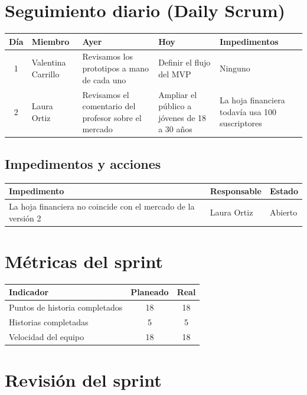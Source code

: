 \documentclass[11pt,a4paper]{article}
\begin{document}
\section{Seguimiento diario (Daily Scrum)}

\begin{tabularx}{\textwidth}{c l X X X}
  \toprule
  \textbf{Día} & \textbf{Miembro} & \textbf{Ayer} & \textbf{Hoy} & \textbf{Impedimentos} \\
  \midrule
  1 & Valentina Carrillo & Revisamos los prototipos a mano de cada uno & Definir el flujo del MVP & Ninguno \\
  2 & Laura Ortiz & Revisamos el comentario del profesor sobre el mercado & Ampliar el público a jóvenes de 18 a 30 años & La hoja financiera todavía usa 100 suscriptores \\
  \bottomrule
\end{tabularx}

\subsection{Impedimentos y acciones}

\begin{tabularx}{\textwidth}{X l l}
  \toprule
  \textbf{Impedimento} & \textbf{Responsable} & \textbf{Estado} \\
  \midrule
  La hoja financiera no coincide con el mercado de la versión 2 & Laura Ortiz & Abierto \\
  \bottomrule
\end{tabularx}

\section{Métricas del sprint}

\begin{tabularx}{\textwidth}{X c c}
  \toprule
  \textbf{Indicador} & \textbf{Planeado} & \textbf{Real} \\
  \midrule
  Puntos de historia completados & 18 & 18 \\
  Historias completadas          & 5 & 5 \\
  Velocidad del equipo           & 18 & 18 \\
  \bottomrule
\end{tabularx}

\section{Revisión del sprint}
\end{document}
